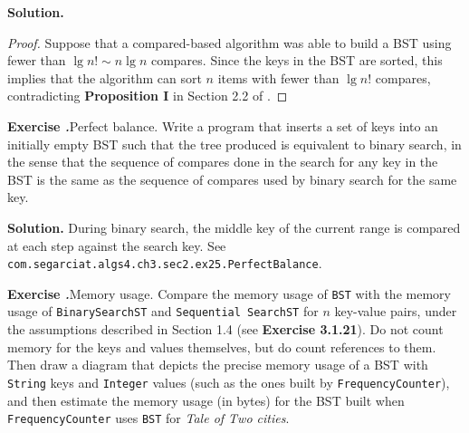 \documentclass[12pt, a4paper]{article}
\newenvironment{ex}[2][Exercise]
{\par\medskip\noindent \textbf{#1 #2.}}
{\medskip}
\newenvironment{sol}[1][Solution]
{\par\medskip\noindent \textbf{#1.} }
{\medskip}
\begin{document}
	\begin{sol}
		\begin{proof}
			Suppose that a compared-based algorithm was able to build a BST using
			fewer than $\lg n!\sim n\lg n$ compares. Since the keys in the BST are sorted,
			this implies that the algorithm can sort $n$ items with fewer than
			$\lg n!$ compares, contradicting \textbf{Proposition I} in Section 2.2
			of \cite{sedgewick_wayne}.
		\end{proof}
	\end{sol}
	\begin{ex}{25}
		\emph{Perfect balance}. Write a program that inserts a set of keys into an initially
		empty BST such that the tree produced is equivalent to binary search, in the
		sense that the sequence of compares done in the search for any key in the BST
		is the same as the sequence of compares used by binary search for the same
		key.
	\end{ex}
	\begin{sol}
		During binary search, the middle key of the current range is compared at
		each step against the search key. See \texttt{com.segarciat.algs4.ch3.sec2.ex25.PerfectBalance}.
	\end{sol}
	\begin{ex}{27}
		\emph{Memory usage}. Compare the memory usage of \texttt{BST} with the memory usage
		of \texttt{BinarySearchST} and \texttt{Sequential SearchST} for $n$ key-value pairs,
		under the assumptions described in Section 1.4 (see \textbf{Exercise 3.1.21}).
		Do not count memory for the keys and values themselves, but do count references to them.
		Then draw a diagram that depicts the precise memory usage of a BST with \texttt{String}
		keys and \texttt{Integer} values (such as the ones built by \texttt{FrequencyCounter}),
		and then estimate the memory usage (in bytes) for the BST built when \texttt{FrequencyCounter}
		uses \texttt{BST} for \emph{Tale of Two cities}.
	\end{ex}
\end{document}
